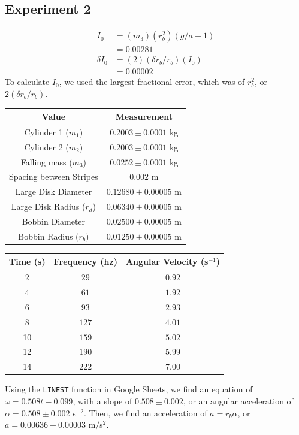\documentclass[9pt]{extarticle}
\begin{document}
{\subsection*{Experiment 2}
\begin{align*}
	I_{0} &= (m_3)(r_b^2)(g/a - 1)\\
	&= 0.00281\\
	\delta I_{0} &= (2)(\delta r_b/r_b)(I_{0}) \\
	&= 0.00002
\end{align*}
To calculate $I_{0}$, we used the largest fractional error, which was of $r_b^2$, or $2(\delta r_b/r_b)$.\\
\begin{center}
	\renewcommand{\arraystretch}{1.5}
	\begin{tabular}{c|c}
		Value & Measurement \\
		\hline
		Cylinder 1 ($m_1$) & $0.2003\pm 0.0001$ kg\\
		Cylinder 2 ($m_2$) & $0.2003\pm 0.0001$ kg \\
		Falling mass ($m_3$) & $0.0252\pm 0.0001$ kg\\
		Spacing between Stripes & $0.002$ m \\
		Large Disk Diameter  & $0.12680\pm 0.00005$ m\\
		Large Disk Radius ($r_{d}$)& $0.06340\pm 0.00005$ m \\
		Bobbin Diameter & $0.02500\pm 0.00005$ m \\
		Bobbin Radius ($r_{b})$& $0.01250\pm 0.00005$ m
	\end{tabular}
\end{center}
\begin{center}
	\renewcommand{\arraystretch}{1.5}
	\begin{tabular}{c|c|c}
	Time (s) & Frequency (hz) & Angular Velocity (s$^{-1}$) \\
	\hline
	2 & $29$ & $0.92$ \\
	4 & $61$ & $1.92$ \\
	6 & $93$ & $2.93$ \\
	8 & $127$ & $4.01$ \\
	10 & $159$ & $5.02$ \\
	12 & $190$ & $5.99$ \\
	14 & $222$ & $7.00$
	\end{tabular}
\end{center}
Using the \texttt{LINEST} function in Google Sheets, we find an equation of $\omega = 0.508t - 0.099$, with a slope of $0.508\pm 0.002$, or an angular acceleration of $\alpha = 0.508\pm 0.002$ s$^{-2}$. Then, we find an acceleration of $a = r_b\alpha$, or $a = 0.00636\pm 0.00003$ m/s$^2$.
}
\end{document}
